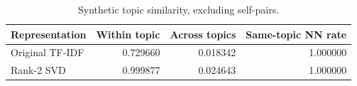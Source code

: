 \par
\begin{table}[htbp]\centering
\small
\caption{Synthetic topic similarity, excluding self-pairs.}
\begin{tabular}{lrrr}\toprule
Representation & Within topic & Across topics & Same-topic NN rate \\ \midrule
Original TF-IDF & 0.729660 & 0.018342 & 1.000000 \\
Rank-2 SVD & 0.999877 & 0.024643 & 1.000000 \\
\bottomrule\end{tabular}
\end{table}
\par
